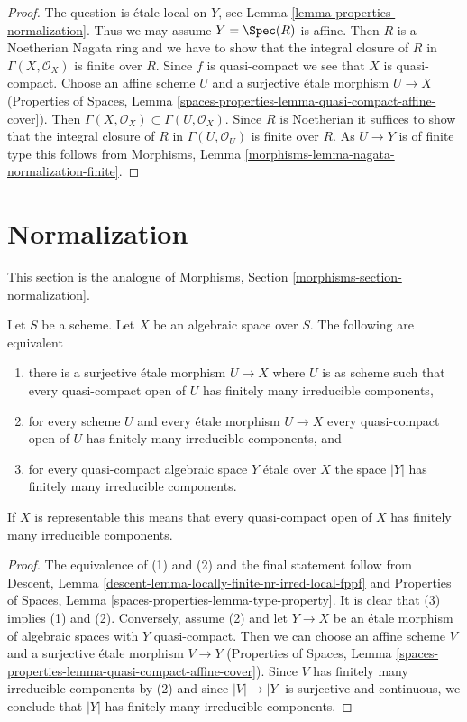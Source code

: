 \begin{proof}
The question is \'etale local on $Y$, see
Lemma \ref{lemma-properties-normalization}.
Thus we may assume $Y = \Spec(R)$ is affine.
Then $R$ is a Noetherian Nagata ring
and we have to show that the integral closure of
$R$ in $\Gamma(X, \mathcal{O}_X)$ is finite over $R$.
Since $f$ is quasi-compact we see that $X$ is quasi-compact.
Choose an affine scheme $U$ and a surjective \'etale
morphism $U \to X$ (Properties of Spaces, Lemma
\ref{spaces-properties-lemma-quasi-compact-affine-cover}).
Then $\Gamma(X, \mathcal{O}_X) \subset \Gamma(U, \mathcal{O}_X)$.
Since $R$ is Noetherian it suffices to show that
the integral closure of $R$ in $\Gamma(U, \mathcal{O}_U)$
is finite over $R$. As $U \to Y$ is of finite type
this follows from
Morphisms, Lemma \ref{morphisms-lemma-nagata-normalization-finite}.
\end{proof}






\section{Normalization}
\label{section-normalization}

\noindent
This section is the analogue of
Morphisms, Section \ref{morphisms-section-normalization}.

\begin{lemma}
\label{lemma-prepare-normalization}
Let $S$ be a scheme. Let $X$ be an algebraic space over $S$.
The following are equivalent
\begin{enumerate}
\item there is a surjective \'etale morphism $U \to X$ where $U$
is as scheme such that every quasi-compact open of $U$ has
finitely many irreducible components,
\item for every scheme $U$ and every \'etale morphism
$U \to X$ every quasi-compact open of $U$ has finitely many
irreducible components, and
\item for every quasi-compact algebraic space $Y$ \'etale over $X$
the space $|Y|$ has finitely many irreducible components.
\end{enumerate}
If $X$ is representable this means that every quasi-compact open of $X$
has finitely many irreducible components.
\end{lemma}

\begin{proof}
The equivalence of (1) and (2) and the final statement follow from
Descent, Lemma \ref{descent-lemma-locally-finite-nr-irred-local-fppf} and
Properties of Spaces, Lemma \ref{spaces-properties-lemma-type-property}.
It is clear that (3) implies (1) and (2). Conversely, assume (2) and
let $Y \to X$ be an \'etale morphism of algebraic spaces with $Y$
quasi-compact. Then we can choose an affine scheme $V$ and a surjective
\'etale morphism $V \to Y$ (Properties of Spaces, Lemma
\ref{spaces-properties-lemma-quasi-compact-affine-cover}).
Since $V$ has finitely many irreducible components by (2) and since
$|V| \to |Y|$ is surjective and continuous, we conclude that
$|Y|$ has finitely many irreducible components.
\end{proof}

